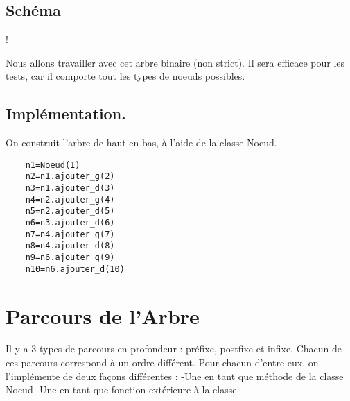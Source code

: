 \documentclass{article}
\begin{document}
\subsection{Schéma}
\begin{center}
\resizebox {\textwidth} {!} {

 }
\end{center}
Nous allons travailler avec cet arbre binaire (non strict). Il sera efficace pour les tests, car il 
comporte tout les types de noeuds possibles.
\subsection{Implémentation.}
On construit l'arbre de haut en bas, à l'aide de la classe Noeud.
\renewcommand{\theFancyVerbLine}{
  \sffamily\textcolor[rgb]{0.5,0.5,0.5}{\scriptsize\arabic{FancyVerbLine}}}

\begin{verbatim}
    n1=Noeud(1)
    n2=n1.ajouter_g(2)
    n3=n1.ajouter_d(3)
    n4=n2.ajouter_g(4)
    n5=n2.ajouter_d(5)
    n6=n3.ajouter_d(6)
    n7=n4.ajouter_g(7)
    n8=n4.ajouter_d(8)
    n9=n6.ajouter_g(9)
    n10=n6.ajouter_d(10)
\end{verbatim}

\newpage
\section{Parcours de l'Arbre}
 Il y a 3 types de parcours en profondeur : préfixe, postfixe et infixe.
 Chacun de ces parcours correspond à un ordre différent.
 Pour chacun d'entre eux, on l'implémente de deux façons différentes :
 \newline
 -Une en tant que méthode de la classe Noeud
 \newline
 -Une en tant que fonction extérieure à la classe
\end{document}
